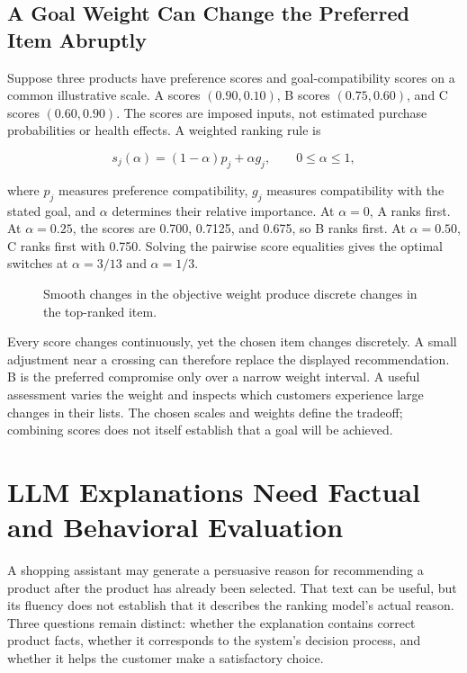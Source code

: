 \hypertarget{M07-a-goal-weight-can-change-the-preferred-item-abruptly}{%
\subsection{A Goal Weight Can Change the Preferred Item
Abruptly}\label{M07-a-goal-weight-can-change-the-preferred-item-abruptly}}

\noindent Suppose three products have preference scores and goal-compatibility
scores on a common illustrative scale. A scores \((0.90,0.10)\), B
scores \((0.75,0.60)\), and C scores \((0.60,0.90)\). The scores are
imposed inputs, not estimated purchase probabilities or health effects.
A weighted ranking rule is

\[
s_j(\alpha)=(1-\alpha)p_j+\alpha g_j,\qquad 0\leq\alpha\leq1,
\]

where \(p_j\) measures preference compatibility, \(g_j\) measures
compatibility with the stated goal, and \(\alpha\) determines their
relative importance. At \(\alpha=0\), A ranks first. At \(\alpha=0.25\),
the scores are 0.700, 0.7125, and 0.675, so B ranks first. At
\(\alpha=0.50\), C ranks first with 0.750. Solving the pairwise score
equalities gives the optimal switches at \(\alpha=3/13\) and
\(\alpha=1/3\).

\begin{figure}[htbp]
\centering

\caption{Smooth changes in the objective weight produce discrete changes in the top-ranked item.}\label{fig:M07_goal_blend}
\end{figure}

Every score changes continuously, yet the chosen item changes
discretely. A small adjustment near a crossing can therefore replace the
displayed recommendation. B is the preferred compromise only over a
narrow weight interval. A useful assessment varies the weight and
inspects which customers experience large changes in their lists. The
chosen scales and weights define the tradeoff; combining scores does not
itself establish that a goal will be achieved.

\hypertarget{M07-llm-explanations-need-factual-and-behavioral-evaluation}{%
\section{LLM Explanations Need Factual and Behavioral
Evaluation}\label{M07-llm-explanations-need-factual-and-behavioral-evaluation}}

\noindent A shopping assistant may generate a persuasive reason for recommending a
product after the product has already been selected. That text can be
useful, but its fluency does not establish that it describes the ranking
model's actual reason. Three questions remain distinct: whether the
explanation contains correct product facts, whether it corresponds to
the system's decision process, and whether it helps the customer make a
satisfactory choice.

